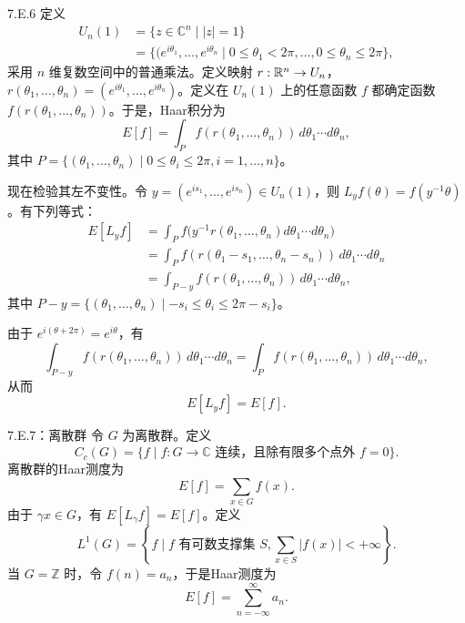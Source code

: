 \begin{bookexample}{7.E.6}
定义
\[
\begin{aligned}
U_n(1)&=\{z\in\mathbb C^n\mid|z|=1\}\\
 &=\{(e^{i\theta_1},\ldots,e^{i\theta_n}\mid
 0\le\theta_1<2\pi,\ldots,0\le\theta_n\le2\pi\},
\end{aligned}
\]
采用 $n$ 维复数空间中的普通乘法。定义映射 $r:\mathbb{R}^n\to U_n$，$r(\theta_1,\ldots,\theta_n)=(e^{i\theta_1},\ldots,e^{i\theta_n})$。定义在 $U_n(1)$ 上的任意函数 $f$ 都确定函数 $f(r(\theta_1,\ldots,\theta_n))$。于是，Haar积分为
\begin{equation}
E[f]=\int_Pf(r(\theta_1,\ldots,\theta_n))\,d\theta_1\cdots d\theta_n,\tag{7.E.12}
\end{equation}
其中 $P=\{(\theta_1,\ldots,\theta_n)\mid0\le\theta_i\le2\pi,i=1,\ldots,n\}$。

现在检验其左不变性。令 $y=(e^{is_1},\ldots,e^{is_n})\in U_n(1)$，则 $L_yf(\theta)=f(y^{-1}\theta)$。有下列等式：
\begin{equation}
\begin{aligned}
E[L_yf]
 &=\int_Pf\bigl(y^{-1}r(\theta_1,\ldots,\theta_n)d\theta_1\cdots d\theta_n\bigr)\\
 &=\int_Pf(r(\theta_1-s_1,\ldots,\theta_n-s_n))\,d\theta_1\cdots d\theta_n\\
 &=\int_{P-y}f(r(\theta_1,\ldots,\theta_n))\,d\theta_1\cdots d\theta_n,
\end{aligned}\tag{7.E.13}
\end{equation}
其中 $P-y=\{(\theta_1,\ldots,\theta_n)\mid-s_i\le\theta_i\le2\pi-s_i\}$。

由于 $e^{i(\theta+2\pi)}=e^{i\theta}$，有
\[
\int_{P-y}f(r(\theta_1,\ldots,\theta_n))\,d\theta_1\cdots d\theta_n
 =\int_Pf(r(\theta_1,\ldots,\theta_n))\,d\theta_1\cdots d\theta_n,
\]
从而
\[
E[L_yf]=E[f].
\]
\end{bookexample}

\begin{bookexample}{7.E.7：离散群}
令 $G$ 为离散群。定义
\[
C_c(G)=\{f\mid f:G\to\mathbb C\text{ 连续，且除有限多个点外 }f=0\}.
\]
离散群的Haar测度为
\[
E[f]=\sum_{x\in G}f(x).
\]
由于 $\gamma x\in G$，有 $E[L_\gamma f]=E[f]$。定义
\[
L^1(G)=\left\{f\mid f\text{ 有可数支撑集 }S,
 \sum_{x\in S}|f(x)|<+\infty\right\}.
\]
当 $G=\mathbb Z$ 时，令 $f(n)=a_n$，于是Haar测度为
\begin{equation}
E[f]=\sum_{n=-\infty}^{\infty}a_n.\tag{7.E.14}
\end{equation}
\end{bookexample}

